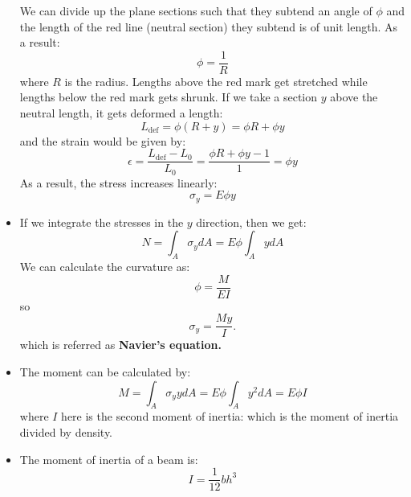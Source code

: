 \begin{itemize}
\begin{center}
\begin{tikzpicture}
        \end{tikzpicture}
    \end{center}
    We can divide up the plane sections such that they subtend an angle of $\phi$ and the length of the red line (neutral section) they subtend is of unit length. As a result:
    \begin{equation}
        \phi = \frac{1}{R}
        \label{eq:}
    \end{equation}
    where $R$ is the radius. Lengths above the red mark get stretched while lengths below the red mark gets shrunk. If we take a section $y$ above the neutral length, it gets deformed a length:
    \begin{equation}
        L_\text{def} = \phi (R+y) = \phi R+\phi y
        \label{eq:}
    \end{equation}
    and the strain would be given by:
    \begin{equation}
        \epsilon = \frac{L_\text{def}-L_0}{L_0}=\frac{\phi R+\phi y-1}{1} = \phi y
        \label{eq:}
    \end{equation}
    As a result, the stress increases linearly:
    \begin{equation}
        \sigma_y = E\phi y
        \label{eq:}
    \end{equation}
    \item If we integrate the stresses in the $y$ direction, then we get:
    \begin{equation}
        N=\int_A \sigma_y dA = E\phi \int_A y dA
        \label{eq:}
    \end{equation}
    We can calculate the curvature as:
    \begin{equation}
        \phi = \frac{M}{EI}
        \label{eq:}
    \end{equation}
    so
    \begin{equation}
        \sigma_y = \frac{My}{I}.
        \label{eq:}
    \end{equation}
    which is referred as \textbf{Navier's equation.}
    \item The moment can be calculated by:
    \begin{equation}
        M = \int_A \sigma_y y dA = E\phi \int_A y^2 dA = E\phi I
        \label{eq:}
    \end{equation}
    where $I$ here is the second moment of inertia: which is the moment of inertia divided by density.
    \item The moment of inertia of a beam is:
    \begin{equation}
        I = \frac{1}{12}bh^3
        \label{eq:}
    \end{equation}
    
\end{itemize}